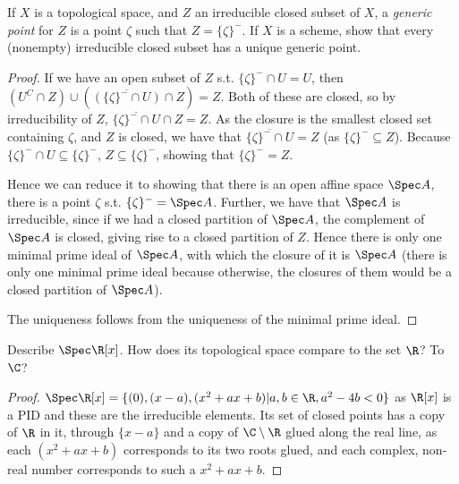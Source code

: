 \begin{exercise}%
	If $X $ is a topological space, and $Z $ an irreducible closed subset of $X $, a \textit{generic point} for $Z $ is a point $\zeta $ such that $Z = \{\zeta\} ^-  $. If $X $ is a scheme, show that every (nonempty) irreducible closed subset has a unique generic point.
\end{exercise}
\begin{proof}
	If we have an open subset of $Z $ s.t. $\{\zeta\} ^-\cap U = U  $, then $(U^C\cap Z) \cup (\overline{(\{\zeta\} ^- \cap U)} \cap Z)= Z$.
	Both of these are closed, so by irreducibility of $Z $, $\overline{\{\zeta\} ^- \cap U }\cap Z = Z $.
	As the closure is the smallest closed set containing $\zeta $, and $Z $ is closed, we have that $\overline{\{\zeta\} ^- \cap U } = Z  $ (as $\{\zeta\} ^- \subseteq Z  $).
	Because $\{\zeta\} ^- \cap U \subseteq \{\zeta\} ^-   $, $Z \subseteq \{\zeta\} ^-  $, showing that $\{\zeta\} ^- = Z  $.

	Hence we can reduce it to showing that there is an open affine space $\Spec A $, there is a point $\zeta $ s.t. $\{\zeta\} ^- = \Spec A  $.
	Further, we have that $\Spec A $ is irreducible, since if we had a closed partition of $\Spec A $, the complement of $\Spec A $ is closed, giving rise to a closed partition of $Z $.
	Hence there is only one minimal prime ideal of $\Spec A $, with which the closure of it is $\Spec A $ (there is only one minimal prime ideal because otherwise, the closures of them would be a closed partition of $\Spec A $).

	The uniqueness follows from the uniqueness of the minimal prime ideal.
\end{proof}

\begin{exercise}
	Describe $\Spec \R[x] $. How does its topological space compare to the set $\R $? To $\C $?
\end{exercise}
\begin{proof}
	$\Spec \R[x] = \{(0), (x-a), (x^2+ax+b) | a,b \in \R, a^2-4b<0\}   $ as $\R[x] $ is a PID and these are the irreducible elements.
	Its set of closed points has a copy of $\R $ in it, through $\{x-a\}   $ and a copy of $\C \setminus \R $ glued along the real line, as each $(x^2+ax+b) $ corresponds to its two roots glued, and each complex, non-real number corresponds to such a $x^2+ax+b $.
\end{proof}

